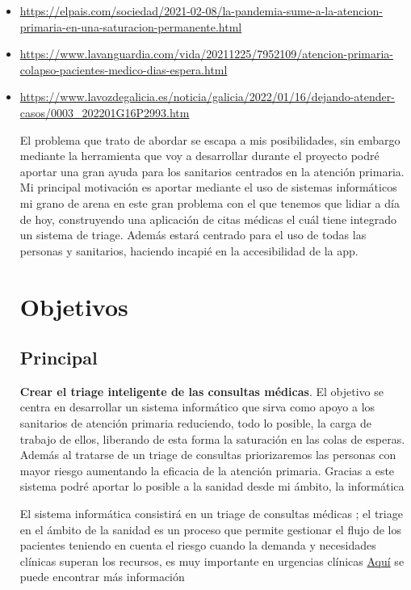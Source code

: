 \begin{itemize}
    \item \url{https://elpais.com/sociedad/2021-02-08/la-pandemia-sume-a-la-atencion-primaria-en-una-saturacion-permanente.html} 
    \item \url{https://www.lavanguardia.com/vida/20211225/7952109/atencion-primaria-colapso-pacientes-medico-dias-espera.html}
    \item \url{https://www.lavozdegalicia.es/noticia/galicia/2022/01/16/dejando-atender-casos/0003_202201G16P2993.htm}

El problema que trato de abordar se escapa a mis posibilidades, sin embargo mediante la herramienta que voy a desarrollar 
durante el proyecto podré aportar una gran ayuda para los sanitarios centrados en la atención primaria.
Mi principal motivación es aportar mediante el uso de sistemas informáticos mi grano de arena en este gran problema con el que 
tenemos que lidiar a día de hoy, construyendo una aplicación de citas médicas el cuál tiene integrado un sistema de triage. 
Además estará centrado para el uso de todas las personas y sanitarios, haciendo incapié en la accesibilidad de la app.

\section{Objetivos}

\subsection{Principal}

\textbf{Crear el triage inteligente de las consultas médicas}. El objetivo se centra en desarrollar un sistema informático que sirva
como apoyo a los sanitarios de atención primaria reduciendo, todo lo posible, la carga de trabajo de ellos, liberando de esta forma 
la saturación en las colas de esperas. Además al tratarse de un triage de consultas priorizaremos las personas con mayor riesgo 
aumentando la eficacia de la atención primaria. Gracias a este sistema podré aportar lo posible a la sanidad desde mi ámbito, la informática

El sistema informática consistirá en un triage de consultas médicas ; el triage en el ámbito de la sanidad es un proceso que permite gestionar
el flujo de los pacientes teniendo en cuenta el riesgo cuando la demanda y necesidades clínicas superan los recursos, es muy importante en urgencias clínicas
\href{https://scielo.isciii.es/scielo.php?script=sci_arttext&pid=S1137-66272010000200008}{Aquí} se puede encontrar más información


\end{itemize}
